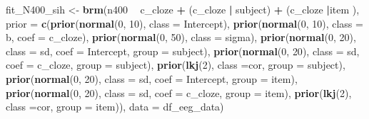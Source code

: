 \documentclass[12pt,]{krantz}
\newenvironment{Shaded}{\begin{snugshade}}{\end{snugshade}}
\newcommand{\DataTypeTok}[1]{\textcolor[rgb]{0.13,0.29,0.53}{#1}}
\newcommand{\DecValTok}[1]{\textcolor[rgb]{0.00,0.00,0.81}{#1}}
\newcommand{\KeywordTok}[1]{\textcolor[rgb]{0.13,0.29,0.53}{\textbf{#1}}}
\newcommand{\NormalTok}[1]{#1}
\newcommand{\OperatorTok}[1]{\textcolor[rgb]{0.81,0.36,0.00}{\textbf{#1}}}
\newcommand{\StringTok}[1]{\textcolor[rgb]{0.31,0.60,0.02}{#1}}
\theoremstyle{definition}
\theoremstyle{definition}
\theoremstyle{definition}
\theoremstyle{remark}
\begin{document}
\begin{Shaded}
\begin{Highlighting}[]
\NormalTok{fit_N400_sih <-}\StringTok{ }\KeywordTok{brm}\NormalTok{(n400 }\OperatorTok{~}\StringTok{ }\NormalTok{c_cloze }\OperatorTok{+}\StringTok{ }\NormalTok{(c_cloze }\OperatorTok{|}\StringTok{ }\NormalTok{subject) }\OperatorTok{+}\StringTok{ }\NormalTok{(c_cloze }\OperatorTok{|}\NormalTok{item ),}
                  \DataTypeTok{prior =}
                      \KeywordTok{c}\NormalTok{(}\KeywordTok{prior}\NormalTok{(}\KeywordTok{normal}\NormalTok{(}\DecValTok{0}\NormalTok{, }\DecValTok{10}\NormalTok{), }\DataTypeTok{class =}\NormalTok{ Intercept),}
                        \KeywordTok{prior}\NormalTok{(}\KeywordTok{normal}\NormalTok{(}\DecValTok{0}\NormalTok{, }\DecValTok{10}\NormalTok{), }\DataTypeTok{class =}\NormalTok{ b, }\DataTypeTok{coef =}\NormalTok{ c_cloze),}
                        \KeywordTok{prior}\NormalTok{(}\KeywordTok{normal}\NormalTok{(}\DecValTok{0}\NormalTok{, }\DecValTok{50}\NormalTok{), }\DataTypeTok{class =}\NormalTok{ sigma),}
                        \KeywordTok{prior}\NormalTok{(}\KeywordTok{normal}\NormalTok{(}\DecValTok{0}\NormalTok{, }\DecValTok{20}\NormalTok{), }\DataTypeTok{class =}\NormalTok{ sd, }\DataTypeTok{coef =}\NormalTok{ Intercept, }\DataTypeTok{group =}\NormalTok{ subject),}
                        \KeywordTok{prior}\NormalTok{(}\KeywordTok{normal}\NormalTok{(}\DecValTok{0}\NormalTok{, }\DecValTok{20}\NormalTok{), }\DataTypeTok{class =}\NormalTok{ sd, }\DataTypeTok{coef =}\NormalTok{ c_cloze, }\DataTypeTok{group =}\NormalTok{ subject),}
                        \KeywordTok{prior}\NormalTok{(}\KeywordTok{lkj}\NormalTok{(}\DecValTok{2}\NormalTok{), }\DataTypeTok{class =}\NormalTok{cor, }\DataTypeTok{group =}\NormalTok{ subject),}
                        \KeywordTok{prior}\NormalTok{(}\KeywordTok{normal}\NormalTok{(}\DecValTok{0}\NormalTok{, }\DecValTok{20}\NormalTok{), }\DataTypeTok{class =}\NormalTok{ sd, }\DataTypeTok{coef =}\NormalTok{ Intercept, }\DataTypeTok{group =}\NormalTok{ item),}
                        \KeywordTok{prior}\NormalTok{(}\KeywordTok{normal}\NormalTok{(}\DecValTok{0}\NormalTok{, }\DecValTok{20}\NormalTok{), }\DataTypeTok{class =}\NormalTok{ sd, }\DataTypeTok{coef =}\NormalTok{ c_cloze, }\DataTypeTok{group =}\NormalTok{ item),}
                        \KeywordTok{prior}\NormalTok{(}\KeywordTok{lkj}\NormalTok{(}\DecValTok{2}\NormalTok{), }\DataTypeTok{class =}\NormalTok{cor, }\DataTypeTok{group =}\NormalTok{ item)),}
                  \DataTypeTok{data =}\NormalTok{ df_eeg_data)}
\end{Highlighting}
\end{Shaded}
\end{document}
